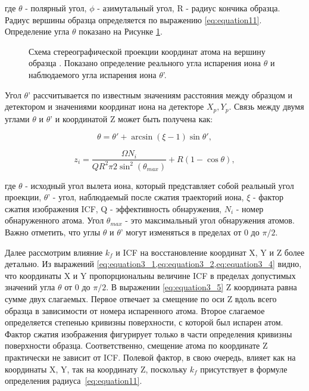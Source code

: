 где $\theta$ - полярный угол, $\phi$ - азимутальный угол, R - радиус кончика образца. Радиус вершины образца определяется по выражению \cref{eq:equation11}.  Определение угла $\theta$ показано на Рисунке \cref{fig:p3_projection}.

\begin{figure}[htb]
	\caption{Схема стереографической проекции координат атома на вершину образца \cite{scbibDensity}. Показано определение реального угла испарения иона $\theta$ и наблюдаемого угла испарения иона $\theta$'.}
	\label{fig:p3_projection}
\end{figure} 

Угол $\theta$' рассчитывается по известным значениям расстояния между образцом и детектором и значениями координат иона на детекторе $X_p, Y_p$. Связь между двумя углами $\theta$ и $\theta$' и координатой Z может быть получена как:

\begin{equation}
	\label{eq:equation3_4}
	\theta = \theta' + \arcsin(\xi - 1)\sin{\theta'},
\end{equation}

\begin{equation}
	\label{eq:equation3_5}
	z_i = \frac{\Omega N_i}{Q R^2 \pi 2 {\sin^2(\theta_{max})}} + R (1- \cos{\theta}),
\end{equation}

где $\theta$ - исходный угол вылета иона, который представляет собой реальный угол проекции, $\theta$' - угол, наблюдаемый после сжатия траекторий иона, $\xi$ - фактор сжатия изображения ICF, Q - эффективность обнаружения, $N_i$ - номер обнаруженного атома. Угол $\theta_{max}$ - это максимальный угол обнаружения атомов. Важно отметить, что углы $\theta$ и $\theta$' могут изменяться в пределах от 0 до $\pi/2$.

Далее рассмотрим влияние $k_f$ и ICF на восстановление координат X, Y и Z более детально. Из выражений \cref{eq:equation3_1,eq:equation3_2,eq:equation3_4} видно, что координаты X и Y  пропорциональны величине ICF в пределах допустимых значений угла $\theta$ от 0 до $\pi/2$. В выражении \cref{eq:equation3_5} Z координата равна сумме двух слагаемых. Первое отвечает за смещение по оси Z вдоль всего образца в зависимости от номера испаренного атома. Второе слагаемое определяется степенью кривизны поверхности, с которой был испарен атом. Фактор сжатия изображения фигурирует только в части определения кривизны поверхности образца. Соответственно, смещение атома по координате Z практически не зависит от ICF. Полевой фактор, в свою очередь, влияет как на координаты X, Y, так на координату Z, поскольку $k_f$ присутствует в формуле определения радиуса~\cref{eq:equation11}.

